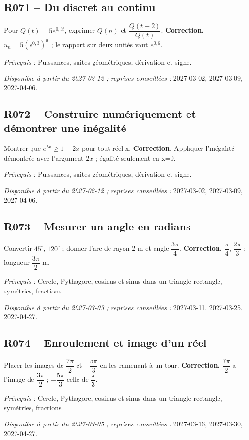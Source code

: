 \subsection*{R071 -- Du discret au continu}\label{R071}
Pour $Q(t)=5e^{0{,}3t}$, exprimer $Q(n)$ et $\dfrac{Q(t+2)}{Q(t)}$.
\ifprof\textbf{Correction.} $u_n=5(e^{0{,}3})^n$ ; le rapport sur deux unités vaut $e^{0{,}6}$.\par\textit{Prérequis :} Puissances, suites géométriques, dérivation et signe.\par\textit{Disponible à partir du 2027-02-12 ; reprises conseillées :} 2027-03-02, 2027-03-09, 2027-04-06.\fi
{}\subsection*{R072 -- Construire numériquement et démontrer une inégalité}\label{R072}
Montrer que $e^{2x}\geq1+2x$ pour tout réel x.
\ifprof\textbf{Correction.} Appliquer l’inégalité démontrée avec l’argument $2x$ ; égalité seulement en x=0.\par\textit{Prérequis :} Puissances, suites géométriques, dérivation et signe.\par\textit{Disponible à partir du 2027-02-12 ; reprises conseillées :} 2027-03-02, 2027-03-09, 2027-04-06.\fi
{}\subsection*{R073 -- Mesurer un angle en radians}\label{R073}
Convertir $45^\circ$, $120^\circ$ ; donner l’arc de rayon 2 m et angle $\dfrac{3\pi}{4}$.
\ifprof\textbf{Correction.} $\dfrac{\pi}{4}$, $\dfrac{2\pi}{3}$ ; longueur $\dfrac{3\pi}{2}$ m.\par\textit{Prérequis :} Cercle, Pythagore, cosinus et sinus dans un triangle rectangle, symétries, fractions.\par\textit{Disponible à partir du 2027-03-03 ; reprises conseillées :} 2027-03-11, 2027-03-25, 2027-04-27.\fi
{}\subsection*{R074 -- Enroulement et image d’un réel}\label{R074}
Placer les images de $\dfrac{7\pi}{2}$ et $-\dfrac{5\pi}{3}$ en les ramenant à un tour.
\ifprof\textbf{Correction.} $\dfrac{7\pi}{2}$ a l’image de $\dfrac{3\pi}{2}$ ; $-\dfrac{5\pi}{3}$ celle de $\dfrac{\pi}{3}$.\par\textit{Prérequis :} Cercle, Pythagore, cosinus et sinus dans un triangle rectangle, symétries, fractions.\par\textit{Disponible à partir du 2027-03-05 ; reprises conseillées :} 2027-03-16, 2027-03-30, 2027-04-27.\fi
